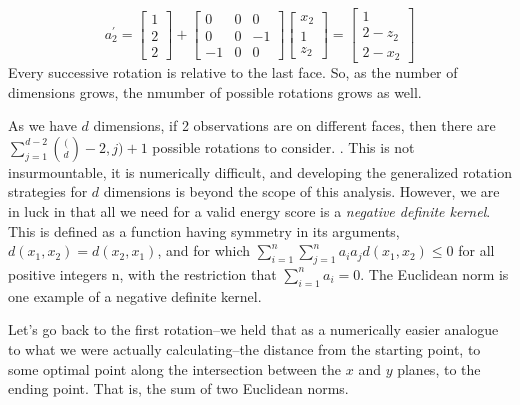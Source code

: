   \begin{equation}
    \label{eq:2drotation}
    a_2^{\prime} = \begin{bmatrix}
    1 \\
    2 \\
    2
    \end{bmatrix}
    +
    \begin{bmatrix}
    0 & 0 & 0  \\
    0 & 0 & -1 \\
    -1 & 0 & 0
    \end{bmatrix}
    \begin{bmatrix}
    x_2 \\
    1 \\
    z_2
    \end{bmatrix} = \begin{bmatrix}
    1 \\
    2 - z_2 \\
    2 - x_2
    \end{bmatrix}
  \end{equation}
Every successive rotation is relative to the last face.  So, as the number of dimensions grows, the
  nmumber of possible rotations grows as well.


As we have $d$ dimensions, if 2 observations are on different faces, then there are
  $\sum_{j = 1}^{d-2}\binom(d-2,j) + 1$ possible rotations to consider. .  This is not insurmountable, it is numerically difficult, and developing
  the generalized rotation strategies for $d$ dimensions is beyond the scope of this analysis.
  However, we are in luck in that all we need for a valid energy score is a
  \emph{negative definite kernel}.  This is defined as a function having symmetry in its arguments,
  $d(x_1,x_2) = d(x_2,x_1)$, and for which $\sum_{i =1}^n\sum_{j=1}^na_ia_jd(x_1,x_2) \leq 0$ for
  all positive integers n, with the restriction that $\sum_{i=1}^na_i = 0$.  The Euclidean norm
  is one example of a negative definite kernel.

Let's go back to the first rotation--we held that as a numerically easier analogue to what we were
  actually calculating--the distance from the starting point, to some optimal point along the
  intersection between the $x$ and $y$ planes, to the ending point.  That is, the sum of two
  Euclidean norms.




